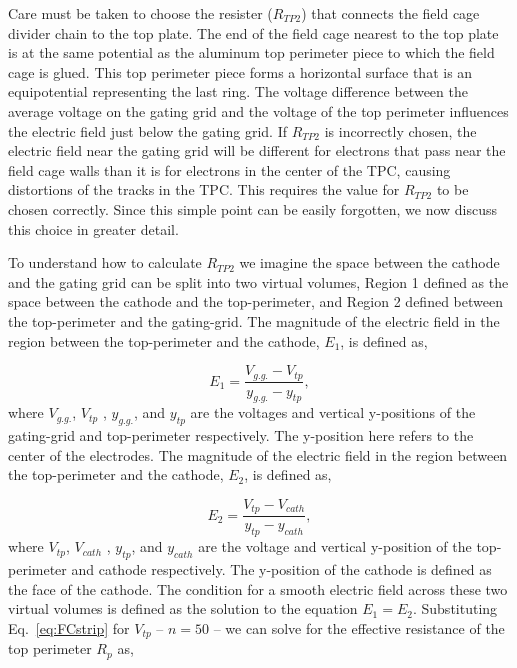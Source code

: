 Care must be taken to choose the resister ($R_{TP2}$) that connects the field cage divider chain to the top plate. The end of the field cage nearest to the top plate is at the same potential as the aluminum top perimeter piece to which the field cage is glued. This top perimeter piece forms a horizontal surface that is an equipotential representing the last ring. The voltage difference between the average voltage on  the gating grid and the voltage of the top perimeter influences the electric field just below the gating grid. If $R_{TP2}$ is incorrectly chosen, the electric field near the gating grid will be different for electrons that pass near the field cage walls than it is for electrons in the center of the TPC,  causing distortions of the tracks in the TPC. This requires the value for $R_{TP2}$ to be chosen correctly. Since this simple point can be easily forgotten, we now discuss this choice in greater detail.

To understand how to calculate $R_{TP2}$ we imagine the space between the cathode and the gating grid can be split into two virtual volumes, Region 1 defined as the space between the cathode and the top-perimeter, and Region 2 defined between the top-perimeter and the gating-grid. The magnitude of the electric field in the region between the top-perimeter and the cathode, $E_1$, is defined as,

\begin{equation}
E_1 = \frac{V_{g.g.} - V_{tp}}{ y_{g.g.} - y_{tp} },
\end{equation}
where  $V_{g.g.}$, $V_{tp}$ , $y_{g.g.}$, and $y_{tp}$ are the voltages and vertical y-positions of the gating-grid and top-perimeter respectively. The y-position here refers to the center of the electrodes. The magnitude of the electric field in the region between the top-perimeter and the cathode, $E_2$, is defined as,

\begin{equation}
E_2 = \frac{V_{tp} - V_{cath}}{ y_{tp} - y_{cath} },
\end{equation}
where  $V_{tp}$, $V_{cath}$ , $y_{tp}$, and $y_{cath}$ are the voltage and vertical y-position of the top-perimeter and cathode respectively. The y-position of the cathode is defined as the face of the cathode. The condition for a smooth electric field across these two virtual volumes is defined as the solution to the equation $E_1 = E_2$. Substituting Eq.~\ref{eq:FCstrip} for $V_{tp}$ -- $n=50$ -- we can solve for the effective resistance of the top perimeter $R_p$ as, 

